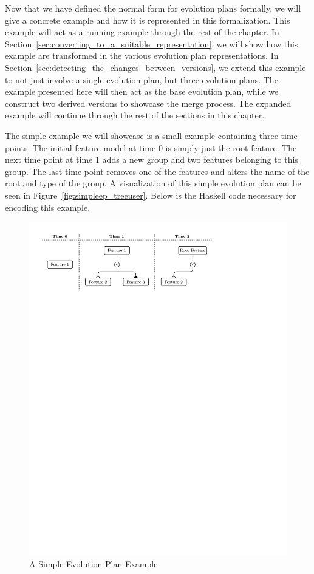 \documentclass[a4paper,english]{ifimaster}
\begin{document}
Now that we have defined the normal form for evolution plans formally, we will give a concrete example and how it is represented in this formalization. This example will act as a running example through the rest of the chapter. In Section~\vref{sec:converting_to_a_suitable_representation}, we will show how this example are transformed in the various evolution plan representations. In Section~\vref{sec:detecting_the_changes_between_versions}, we extend this example to not just involve a single evolution plan, but three evolution plans. The example presented here will then act as the base evolution plan, while we construct two derived versions to showcase the merge process. The expanded example will continue through the rest of the sections in this chapter.

The simple example we will showcase is a small example containing three time points. The initial feature model at time 0 is simply just the root feature. The next time point at time 1 adds a new group and two features belonging to this group. The last time point removes one of the features and alters the name of the root and type of the group. A visualization of this simple evolution plan can be seen in Figure~\vref{fig:simpleep_treeuser}. Below is the Haskell code necessary for encoding this example.

\begin{figure}[htpb]
  \centering
  \includegraphics[width=\linewidth]{simpleep_treeuser.pdf}
  \caption{A Simple Evolution Plan Example}%
  \label{fig:simpleep_treeuser}
\end{figure}
\end{document}
